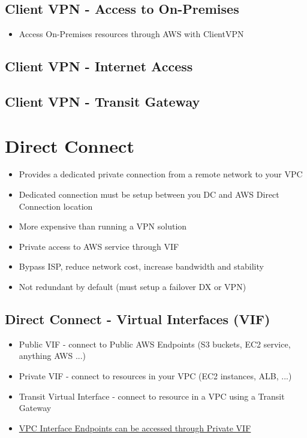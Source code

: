 \subsection{Client VPN - Access to On-Premises}
\begin{itemize}
    \item Access On-Premises resources through AWS with ClientVPN
\end{itemize}

\subsection{Client VPN - Internet Access}

\subsection{Client VPN - Transit Gateway}


\section{Direct Connect}
\begin{itemize}
    \item Provides a dedicated private connection from a remote network to your VPC
    \item Dedicated connection must be setup between you DC and AWS Direct Connection location
    \item More expensive than running a VPN solution
    \item Private access to AWS service through VIF
    \item Bypass ISP, reduce network cost, increase bandwidth and stability
    \item Not redundant by default (must setup a failover DX or VPN)
\end{itemize}

\subsection{Direct Connect - Virtual Interfaces (VIF)}
\begin{itemize}
    \item Public VIF - connect to Public AWS Endpoints (S3 buckets, EC2 service, anything AWS ...)
    \item Private VIF - connect to resources in your VPC (EC2 instances, ALB, ...)
    \item Transit Virtual Interface - connect to resource in a VPC using a Transit Gateway
    \item \underline{VPC Interface Endpoints can be accessed through Private VIF}
\end{itemize}

